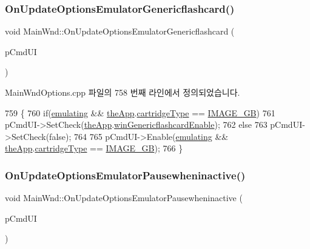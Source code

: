 \subsubsection{\texorpdfstring{On\+Update\+Options\+Emulator\+Genericflashcard()}{OnUpdateOptionsEmulatorGenericflashcard()}}
{\footnotesize\ttfamily void Main\+Wnd\+::\+On\+Update\+Options\+Emulator\+Genericflashcard (\begin{DoxyParamCaption}\item[{C\+Cmd\+UI $\ast$}]{p\+Cmd\+UI }\end{DoxyParamCaption})\hspace{0.3cm}{\ttfamily [protected]}}



Main\+Wnd\+Options.\+cpp 파일의 758 번째 라인에서 정의되었습니다.


\begin{DoxyCode}
759 \{
760   \textcolor{keywordflow}{if}(\mbox{\hyperlink{_main_wnd_options_8cpp_af9cc36078b1b311753963297ae7f2a74}{emulating}} && \mbox{\hyperlink{_v_b_a_8cpp_a8095a9d06b37a7efe3723f3218ad8fb3}{theApp}}.\mbox{\hyperlink{class_v_b_a_af300759fcbc7eeb00ce73f956fc5ddb7}{cartridgeType}} == \mbox{\hyperlink{_util_8h_aef8b88d56fdf9a25f990a68d80c014d8a72281d361ec2edaf47e3a93b136dd4ed}{IMAGE\_GB}})
761   pCmdUI->SetCheck(\mbox{\hyperlink{_v_b_a_8cpp_a8095a9d06b37a7efe3723f3218ad8fb3}{theApp}}.\mbox{\hyperlink{class_v_b_a_ac51ec97cd7b489be24edc77f346e5de7}{winGenericflashcardEnable}});
762     \textcolor{keywordflow}{else}
763   pCmdUI->SetCheck(\textcolor{keyword}{false});
764 
765   pCmdUI->Enable(\mbox{\hyperlink{_main_wnd_options_8cpp_af9cc36078b1b311753963297ae7f2a74}{emulating}} && \mbox{\hyperlink{_v_b_a_8cpp_a8095a9d06b37a7efe3723f3218ad8fb3}{theApp}}.\mbox{\hyperlink{class_v_b_a_af300759fcbc7eeb00ce73f956fc5ddb7}{cartridgeType}} == 
      \mbox{\hyperlink{_util_8h_aef8b88d56fdf9a25f990a68d80c014d8a72281d361ec2edaf47e3a93b136dd4ed}{IMAGE\_GB}});
766 \}
\end{DoxyCode}
\mbox{\label{class_main_wnd_a10dd32a50e583f5ddb0d2af4ecfd0440}} 
\subsubsection{\texorpdfstring{On\+Update\+Options\+Emulator\+Pausewheninactive()}{OnUpdateOptionsEmulatorPausewheninactive()}}
{\footnotesize\ttfamily void Main\+Wnd\+::\+On\+Update\+Options\+Emulator\+Pausewheninactive (\begin{DoxyParamCaption}\item[{C\+Cmd\+UI $\ast$}]{p\+Cmd\+UI }\end{DoxyParamCaption})\hspace{0.3cm}{\ttfamily [protected]}}



